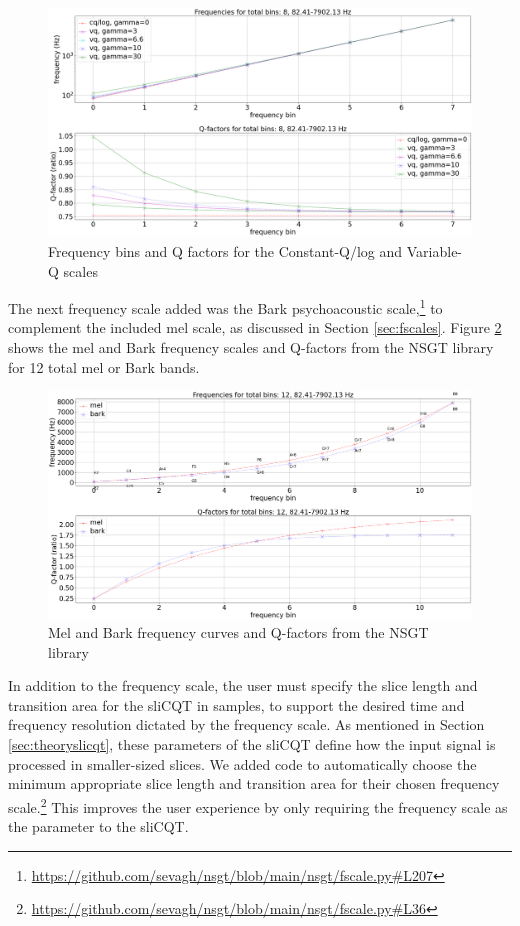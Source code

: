 \documentclass[report.tex]{subfiles}
\begin{document}
\begin{figure}[ht]
	\centering
	\includegraphics[width=\textwidth]{./images-freqscales/vqlog.png}
	\caption{Frequency bins and Q factors for the Constant-Q/log and Variable-Q scales}
	\label{fig:vq}
\end{figure}

The next frequency scale added was the Bark psychoacoustic scale,\footnote{\url{https://github.com/sevagh/nsgt/blob/main/nsgt/fscale.py\#L207}} to complement the included mel scale, as discussed in Section \ref{sec:fscales}. Figure \ref{fig:melbarkfsandqs} shows the mel and Bark frequency scales and Q-factors from the NSGT library for 12 total mel or Bark bands.

\begin{figure}[ht]
	\centering
	\includegraphics[width=\textwidth]{./images-freqscales/melbarkpitchesqs.png}
	\caption{Mel and Bark frequency curves and Q-factors from the NSGT library}
	\label{fig:melbarkfsandqs}
\end{figure}

In addition to the frequency scale, the user must specify the slice length and transition area for the sliCQT in samples, to support the desired time and frequency resolution dictated by the frequency scale. As mentioned in Section \ref{sec:theoryslicqt}, these parameters of the sliCQT define how the input signal is processed in smaller-sized slices. We added code to automatically choose the minimum appropriate slice length and transition area for their chosen frequency scale.\footnote{\url{https://github.com/sevagh/nsgt/blob/main/nsgt/fscale.py\#L36}} This improves the user experience by only requiring the frequency scale as the parameter to the sliCQT.
\end{document}
